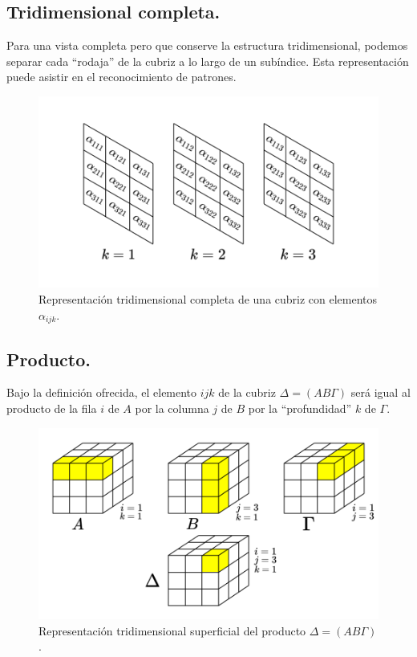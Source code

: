 \documentclass[a4paper, titlepage]{article}
\begin{document}
\subsection{Tridimensional completa.}

Para una vista completa pero que conserve la estructura tridimensional, podemos separar cada ``rodaja'' de la cubriz a lo largo de un subíndice. Esta representación puede asistir en el reconocimiento de patrones.

\begin{figure}[H]
	\includegraphics[width=\linewidth]{media/tridimensional_comp.png}
	\caption{Representación tridimensional completa de una cubriz con elementos $\alpha_{ijk}$.}
\end{figure}

\subsection{Producto.}

Bajo la definición ofrecida, el elemento $ijk$ de la cubriz $\Delta = (AB\Gamma)$ será igual al producto de la fila $i$ de $A$ por la columna $j$ de $B$ por la ``profundidad'' $k$ de $\Gamma$.

\begin{figure}[H]
	\includegraphics[width=\linewidth]{media/product.png}
	\caption{Representación tridimensional superficial del producto $\Delta = (AB\Gamma)$.}
\end{figure}
\end{document}
